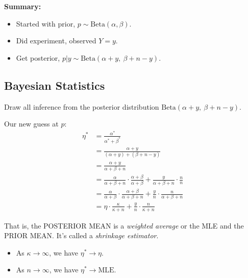 \documentclass[captions=tableheading]{scrbook}
\begin{document}
\begin{itemize}
\begin{enumerate}
   \textbf{Summary:}
\begin{itemize}
\item Started with prior, \(p \sim \mathrm{Beta}(\alpha,\beta).  \)
\item Did experiment, observed $Y = y$.
\item Get posterior, \(p|y \sim \mathrm{Beta}(\alpha + y,\ \beta + n - y).  \)
\end{itemize}
\end{enumerate}

\end{itemize} %
\subsection{Bayesian Statistics}
\label{sec-1_3_2}

Draw all inference from the posterior distribution $\mathrm{Beta}(\alpha + y,\ \beta + n - y)$.

Our new guess at $p$:
\begin{align*}
\eta^{\ast} &= \frac{\alpha^{\ast}}{\alpha^{\ast}+\beta^{\ast}} \\
&= \frac{\alpha + y}{(\alpha + y) + (\beta + n - y)} \\
&= \frac{\alpha + y}{\alpha + \beta + n} \\
&= \frac{\alpha}{\alpha + \beta + n}\cdot\frac{\alpha + \beta}{\alpha + \beta} + \frac{y}{\alpha + \beta + n}\cdot\frac{n}{n} \\
&= \frac{\alpha}{\alpha + \beta}\cdot\frac{\alpha + \beta}{\alpha + \beta + n} + \frac{y}{n}\cdot\frac{n}{\alpha + \beta + n} \\
&= \eta\cdot\frac{\kappa}{\kappa + n} + \frac{y}{n}\cdot\frac{n}{\kappa + n}
\end{align*}

That is, the POSTERIOR MEAN is a \emph{weighted average} or the MLE and the PRIOR MEAN.  It's called a \emph{shrinkage estimator}.


\begin{itemize}
\item As $\kappa \to \infty$, we have $\eta^{\ast} \to \eta$.
\item As $n \to \infty$, we have $\eta^{\ast} \to \mathrm{MLE}$.
\end{itemize}
\end{document}
